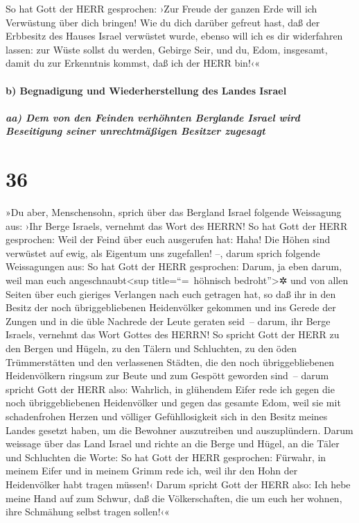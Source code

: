 So hat Gott der HERR gesprochen: ›Zur Freude der ganzen
Erde will ich Verwüstung über dich bringen! Wie du dich
darüber gefreut hast, daß der Erbbesitz des Hauses Israel verwüstet
wurde, ebenso will ich es dir widerfahren lassen: zur Wüste sollst du
werden, Gebirge Seir, und du, Edom, insgesamt, damit du zur Erkenntnis
kommst, daß ich der HERR bin!‹«

\hypertarget{b-begnadigung-und-wiederherstellung-des-landes-israel}{%
\paragraph{b) Begnadigung und Wiederherstellung des Landes
Israel}\label{b-begnadigung-und-wiederherstellung-des-landes-israel}}

\hypertarget{aa-dem-von-den-feinden-verhuxf6hnten-berglande-israel-wird-beseitigung-seiner-unrechtmuxe4uxdfigen-besitzer-zugesagt}{%
\subparagraph{aa) Dem von den Feinden verhöhnten Berglande Israel wird
Beseitigung seiner unrechtmäßigen Besitzer
zugesagt}\label{aa-dem-von-den-feinden-verhuxf6hnten-berglande-israel-wird-beseitigung-seiner-unrechtmuxe4uxdfigen-besitzer-zugesagt}}

\hypertarget{section-35}{%
\section{36}\label{section-35}}

»Du aber, Menschensohn, sprich über das Bergland Israel
folgende Weissagung aus: ›Ihr Berge Israels, vernehmt das Wort des
HERRN! So hat Gott der HERR gesprochen: Weil der Feind
über euch ausgerufen hat: Haha! Die Höhen sind verwüstet auf ewig, als
Eigentum uns zugefallen! --, darum sprich folgende
Weissagungen aus: So hat Gott der HERR gesprochen: Darum, ja eben darum,
weil man euch angeschnaubt\textless sup title=``=~höhnisch
bedroht''\textgreater✲ und von allen Seiten über euch gieriges Verlangen
nach euch getragen hat, so daß ihr in den Besitz der noch
übriggebliebenen Heidenvölker gekommen und ins Gerede der Zungen und in
die üble Nachrede der Leute geraten seid~-- darum, ihr
Berge Israels, vernehmt das Wort Gottes des HERRN! So spricht Gott der
HERR zu den Bergen und Hügeln, zu den Tälern und Schluchten, zu den öden
Trümmerstätten und den verlassenen Städten, die den noch
übriggebliebenen Heidenvölkern ringsum zur Beute und zum Gespött
geworden sind~-- darum spricht Gott der HERR also:
Wahrlich, in glühendem Eifer rede ich gegen die noch übriggebliebenen
Heidenvölker und gegen das gesamte Edom, weil sie mit schadenfrohen
Herzen und völliger Gefühllosigkeit sich in den Besitz meines Landes
gesetzt haben, um die Bewohner auszutreiben und auszuplündern.
Darum weissage über das Land Israel und richte an die
Berge und Hügel, an die Täler und Schluchten die Worte: So hat Gott der
HERR gesprochen: Fürwahr, in meinem Eifer und in meinem Grimm rede ich,
weil ihr den Hohn der Heidenvölker habt tragen müssen!‹
Darum spricht Gott der HERR also: Ich hebe meine Hand auf
zum Schwur, daß die Völkerschaften, die um euch her wohnen, ihre
Schmähung selbst tragen sollen!‹«


